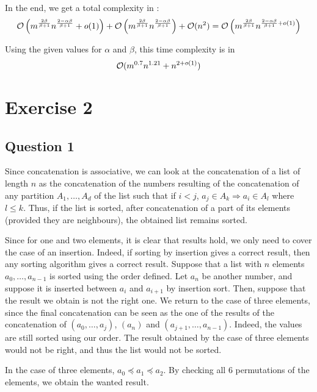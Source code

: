 \documentclass{cours}
\begin{document}
        In the end, we get a total complexity in : 
        \[
            \mathcal{O}\left(m^{\frac{2\beta}{\beta + 1}}n^{\frac{2 - \alpha \beta}{\beta + 1}} + o(1)\right) + \mathcal{O}\left(m^{\frac{2\beta}{\beta + 1}}n^{\frac{2 - \alpha \beta}{\beta + 1}}\right) + \mathcal{O}(n^{2}) = \mathcal{O}\left(m^{\frac{2\beta}{\beta + 1}}n^{\frac{2 - \alpha \beta}{\beta + 1} + o(1)}\right)
        \]

        Using the given values for $\alpha$ and $\beta$, this time complexity is in \[\mathcal{O}(m^{0.7}n^{1.21} + n^{2 + o(1)})\]   

    \newpage
    \section{Exercise 2}
        \subsection{Question 1}
            Since concatenation is associative, we can look at the concatenation of a list of length $n$ as the concatenation of the numbers resulting of the concatenation of any partition $A_{1}, \ldots, A_{d}$ of the list such that if $i < j$, $a_{j} \in A_{k} \Rightarrow a_{i} \in A_{l}$ where $l \leq k$. Thus, if the list is sorted, after concatenation of a part of its elements (provided they are neighbours), the obtained list remains sorted. 
            
            Since for one and two elements, it is clear that results hold, we only need to cover the case of an insertion. Indeed, if sorting by insertion gives a correct result, then any sorting algorithm gives a correct result. Suppose that a list with $n$ elements $a_{0}, \ldots, a_{n- 1}$ is sorted using the order defined. Let $a_{n}$ be another number, and suppose it is inserted between $a_{i}$ and $a_{i + 1}$ by insertion sort.
            Then, suppose that the result we obtain is not the right one. We return to the case of three elements, since the final concatenation can be seen as the one of the results of the concatenation of $(a_{0}, \ldots, a_{j})$, $(a_{n})$ and $(a_{j + 1}, \ldots, a_{n - 1})$. Indeed, the values are still sorted using our order. The result obtained by the case of three elements would not be right, and thus the list would not be sorted. 

            In the case of three elements, $a_{0} \preceq a_{1} \preceq a_{2}$. By checking all $6$ permutations of the elements, we obtain the wanted result. 
\end{document}
